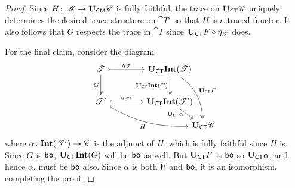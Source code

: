 \documentclass[11pt,oneside,article]{memoir}
\begin{document}
\begin{proof}
   Since $H\colon\mathscr{M}\to\mathbf{U}_{\mathsf{CM}}\mathscr{C}$ is fully faithful, the trace on $\mathbf{U}_{\mathsf{CT}}\mathscr{C}$ uniquely determines the desired trace structure on $\cat{T}'$ so that $H$ is a traced functor. It also follows that $G$ respects the trace in $\cat{T}$ since $\mathbf{U}_{\mathsf{CT}} F\circ\eta_{\mathscr{T}}$ does.

   For the final claim, consider the diagram
   \[ \begin{tikzcd}[column sep=4em, row sep=5ex]
      \cat{T} \ar[r,hook,"\eta_{\cat{T}}"] \ar[d,two heads,"G"']
         & \UCT\Int(\cat{T}) \ar[d,two heads,"\UCT\Int(G)"']
            \ar[ddr,two heads,bend left=25,"\UCT F"] &[between origins] \\
      \cat{T}' \ar[r,hook,"\eta_{\cat{T}'}"] \ar[drr,hook,bend right=15,"H"']
         & \UCT\Int(\cat{T}') \ar[dr,"\UCT\alpha"' {inner sep=0pt,pos=.25}] & \\[-10]
      &&\UCT \cat{C}
   \end{tikzcd} \]
   where $\alpha\colon\mathbf{Int}(\mathscr{T}')\to \mathscr{C}$ is the adjunct of $H$, which is fully faithful since $H$ is. Since $G$ is $\mathsf{bo}$, $\mathbf{U}_{\mathsf{CT}}\mathbf{Int}(G)$ will be $\mathsf{bo}$ as well. But $\mathbf{U}_{\mathsf{CT}} F$ is $\mathsf{bo}$ so $\mathbf{U}_{\mathsf{CT}} \alpha$, and hence $\alpha$, must be $\mathsf{bo}$ also. Since $\alpha$ is both $\mathsf{ff}$ and $\mathsf{bo}$, it is an isomorphism, completing the proof.
\end{proof}
\end{document}
